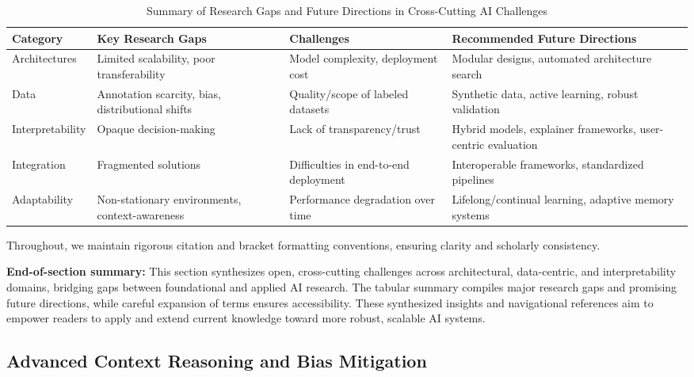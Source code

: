 \documentclass[sigconf]{acmart}
\begin{document}
\begin{table*}[htbp]
\centering
\caption{Summary of Research Gaps and Future Directions in Cross-Cutting AI Challenges}
\label{tab:research_gaps_future_directions}
\begin{adjustbox}{max width=\textwidth}
\begin{tabular}{@{}llll@{}}
\toprule
Category & Key Research Gaps & Challenges & Recommended Future Directions \\
\midrule
Architectures & Limited scalability, poor transferability & Model complexity, deployment cost & Modular designs, automated architecture search \\
Data & Annotation scarcity, bias, distributional shifts & Quality/scope of labeled datasets & Synthetic data, active learning, robust validation \\
Interpretability & Opaque decision-making & Lack of transparency/trust & Hybrid models, explainer frameworks, user-centric evaluation \\
Integration & Fragmented solutions & Difficulties in end-to-end deployment & Interoperable frameworks, standardized pipelines \\
Adaptability & Non-stationary environments, context-awareness & Performance degradation over time & Lifelong/continual learning, adaptive memory systems \\
\bottomrule
\end{tabular}
\end{adjustbox}
\end{table*}

Throughout, we maintain rigorous citation and bracket formatting conventions, ensuring clarity and scholarly consistency.

\textbf{End-of-section summary:} This section synthesizes open, cross-cutting challenges across architectural, data-centric, and interpretability domains, bridging gaps between foundational and applied AI research. The tabular summary compiles major research gaps and promising future directions, while careful expansion of terms ensures accessibility. These synthesized insights and navigational references aim to empower readers to apply and extend current knowledge toward more robust, scalable AI systems.

\subsection{Advanced Context Reasoning and Bias Mitigation}
\end{document}
